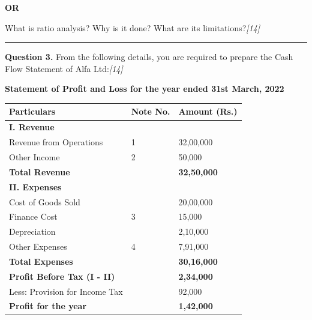 \documentclass[11pt,a4paper]{article}
\newcommand{\pts}[1]{\hfill   \textit{[#1]}}
\begin{document}
\centerline{   \textbf{OR}}

What is ratio analysis? Why is it done? What are its limitations?\pts{14}

\medskip\rule{\linewidth}{0.2pt}


\newpage




\noindent   \textbf{Question 3.}
From the following details, you are required to prepare the Cash Flow Statement of Alfa Ltd:\pts{14}


\begin{center}
   \textbf{Statement of Profit and Loss for the year ended 31st March, 2022}
\vskip 5pt

\begin{tabular}{lll}
  \hline
  Particulars & Note No. & Amount (Rs.) \\
  \hline
   \textbf{I. Revenue} & & \\
  \quad Revenue from Operations & 1 & 32,00,000 \\
  \quad Other Income & 2 & 50,000 \\
   \textbf{Total Revenue} & &   \textbf{32,50,000} \\
  \hline
   \textbf{II. Expenses} & & \\
  \quad Cost of Goods Sold & & 20,00,000 \\
  \quad Finance Cost & 3 & 15,000 \\
  \quad Depreciation & & 2,10,000 \\
  \quad Other Expenses & 4 & 7,91,000 \\
   \textbf{Total Expenses} & &   \textbf{30,16,000} \\
  \hline
   \textbf{Profit Before Tax (I - II)} & &   \textbf{2,34,000} \\
  \quad Less: Provision for Income Tax & & 92,000 \\
  \hline
   \textbf{Profit for the year} & &   \textbf{1,42,000} \\
  \hline
\end{tabular}
\end{center}
\end{document}
